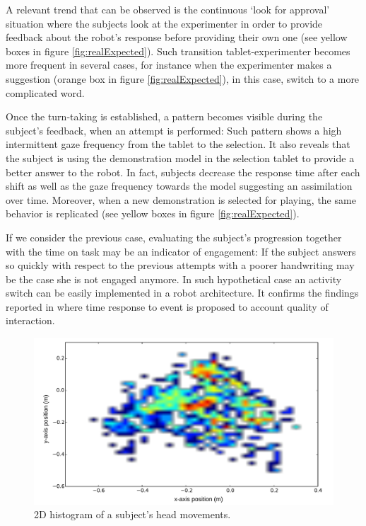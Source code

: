 \documentclass{sig-alternate}
\begin{document}
A relevant trend that can be observed is the continuous `look for approval' situation where the subjects look at the experimenter in order to provide feedback about the robot's response before providing their own one (see yellow boxes in figure \ref{fig:realExpected}). Such transition tablet-experimenter becomes more frequent in several cases, for instance when the experimenter makes a suggestion (orange box in figure \ref{fig:realExpected}), in this case, switch to a more complicated word.

Once the turn-taking is established, a pattern becomes visible during the subject's feedback, when an attempt is performed: Such pattern shows a high intermittent gaze frequency from the tablet to the selection. It also reveals that the subject is using the demonstration model in the selection tablet to provide a better answer to the robot. In fact, subjects decrease the response time after each shift as well as the gaze frequency towards the model suggesting an assimilation over time. Moreover, when a new demonstration is selected for playing, the same behavior is replicated (see yellow boxes in figure \ref{fig:realExpected}).

If we consider the previous case, evaluating the subject's progression together with the time on task may be an indicator of engagement: If the subject answers so quickly with respect to the previous attempts with a poorer handwriting may be the case she is not engaged anymore. In such hypothetical case an activity switch can be easily implemented in a robot architecture. It confirms the findings reported in \cite{anzalone} where time response to event is proposed to account quality of interaction. 

\begin{figure}[h!]
    \centering
    \includegraphics[width=0.9\columnwidth]{heatmap}
    \caption{\small 2D histogram of a subject's head movements.}
    \label{heatmap}
\end{figure}
\end{document}
